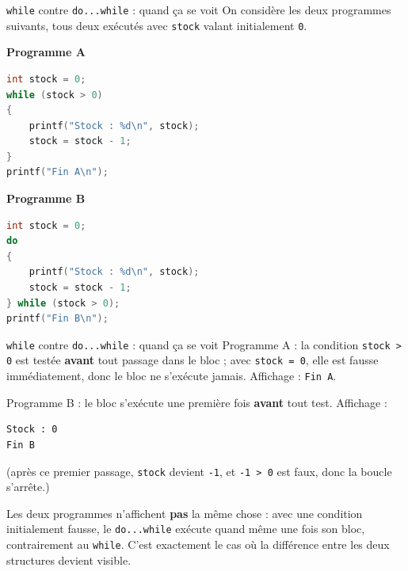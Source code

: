 \begin{UPSTIexercice}{\texttt{while} contre \texttt{do...while} : quand ça se voit}
    On considère les deux programmes suivants, tous deux exécutés avec \texttt{stock} valant initialement \texttt{0}.
    \noindent\\
    \begin{minipage}[t]{0.48\linewidth}
        \textbf{Programme A}
        \begin{lstlisting}[language=C]
int stock = 0;
while (stock > 0)
{
    printf("Stock : %d\n", stock);
    stock = stock - 1;
}
printf("Fin A\n");
        \end{lstlisting}
    \end{minipage}\hfill
    \begin{minipage}[t]{0.48\linewidth}
        \textbf{Programme B}
        \begin{lstlisting}[language=C]
int stock = 0;
do
{
    printf("Stock : %d\n", stock);
    stock = stock - 1;
} while (stock > 0);
printf("Fin B\n");
        \end{lstlisting}
    \end{minipage}
\end{UPSTIexercice}

\begin{UPSTIprofOnlyEnv}
    \begin{UPSTIcorrectionP}{\texttt{while} contre \texttt{do...while} : quand ça se voit}
        Programme A : la condition \texttt{stock > 0} est testée \textbf{avant} tout passage dans le bloc ; avec \texttt{stock = 0}, elle est fausse immédiatement, donc le bloc ne s'exécute jamais. Affichage : \texttt{Fin A}.

        Programme B : le bloc s'exécute une première fois \textbf{avant} tout test. Affichage :
        \begin{lstlisting}[language=bash,style=console]
Stock : 0
Fin B
        \end{lstlisting}
        (après ce premier passage, \texttt{stock} devient \texttt{-1}, et \texttt{-1 > 0} est faux, donc la boucle s'arrête.)

        Les deux programmes n'affichent \textbf{pas} la même chose : avec une condition initialement fausse, le \texttt{do...while} exécute quand même une fois son bloc, contrairement au \texttt{while}. C'est exactement le cas où la différence entre les deux structures devient visible.
    \end{UPSTIcorrectionP}
\end{UPSTIprofOnlyEnv}
